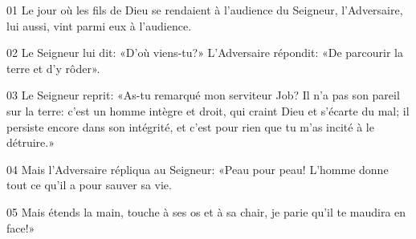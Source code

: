 01 Le jour où les fils de Dieu se rendaient à l’audience du Seigneur, l’Adversaire, lui aussi, vint parmi eux à l’audience.

02 Le Seigneur lui dit: «D’où viens-tu?» L’Adversaire répondit: «De parcourir la terre et d’y rôder».

03 Le Seigneur reprit: «As-tu remarqué mon serviteur Job? Il n’a pas son pareil sur la terre: c’est un homme intègre et droit, qui craint Dieu et s’écarte du mal; il persiste encore dans son intégrité, et c’est pour rien que tu m’as incité à le détruire.»

04 Mais l’Adversaire répliqua au Seigneur: «Peau pour peau! L’homme donne tout ce qu’il a pour sauver sa vie.

05 Mais étends la main, touche à ses os et à sa chair, je parie qu’il te maudira en face!»
